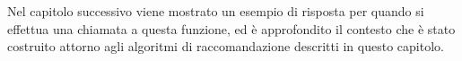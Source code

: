 Nel capitolo successivo viene mostrato un esempio di risposta per quando si effettua una chiamata a questa funzione, ed è approfondito il contesto che 
è stato costruito attorno agli algoritmi di raccomandazione descritti in questo capitolo.
